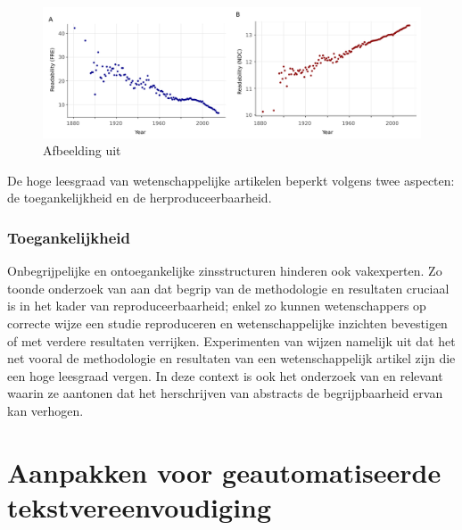 \begin{figure}[H]
	\includegraphics[width=\linewidth]{img/fre-ndc.png}
	\caption{Afbeelding uit \textcite{PlavenSigray2017}}
	\label{img:fre-ndc}
\end{figure}

De hoge leesgraad van wetenschappelijke artikelen beperkt volgens \textcite{PlavenSigray2017} twee aspecten: de toegankelijkheid en de herproduceerbaarheid.

\subsubsection{Toegankelijkheid}




Onbegrijpelijke en ontoegankelijke zinsstructuren hinderen ook vakexperten. Zo toonde onderzoek van \textcite{McNutt2014} aan dat begrip van de methodologie en resultaten cruciaal is in het kader van reproduceerbaarheid; enkel zo kunnen wetenschappers op correcte wijze een studie reproduceren en wetenschappelijke inzichten bevestigen of met verdere resultaten verrijken. Experimenten van \textcite{Hubbard2017} wijzen namelijk uit dat het net vooral de methodologie en resultaten van een wetenschappelijk artikel zijn die een hoge leesgraad vergen. In deze context is ook het onderzoek van \textcite{Hartley1999} en \textcite{Snow2010} relevant waarin ze aantonen dat het herschrijven van abstracts de begrijpbaarheid ervan kan verhogen.




\section{Aanpakken voor geautomatiseerde tekstvereenvoudiging}

